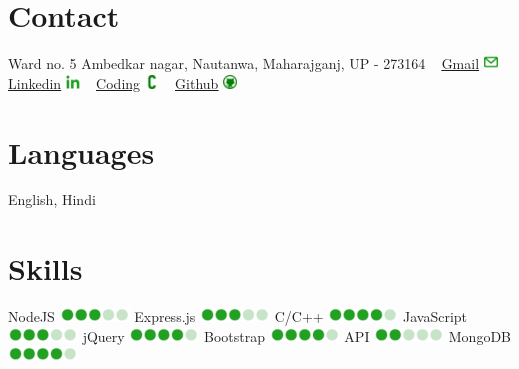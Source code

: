 \documentclass[]{cv-style}          %
\begin{document}
\newcommand{\Iconemail}{\includegraphics[width=1em]{email.png}}
\newcommand{\Iconlinkedin}{\includegraphics[width=1em]{linkedin.png}}
\newcommand{\Iconc}{\includegraphics[width=1em]{c.jpg}}
\newcommand{\Icongithub}{\includegraphics[width=1em]{github.jpg}}
\newcommand{\Iconone}{\includegraphics[width=5em]{1.png}}
\newcommand{\Icontwo}{\includegraphics[width=5em]{2.png}}
\newcommand{\Iconthree}{\includegraphics[width=5em]{3.png}}
\newcommand{\Iconfour}{\includegraphics[width=5em]{4.png}}
\newcommand{\Iconfive}{\includegraphics[width=5em]{5.png}}



\begin{aside}
%
\section{Contact}
Ward no. 5 Ambedkar nagar, Nautanwa, Maharajganj, UP - 273164
~
\href{mailto:arsalanmohd237@gmail.com}{\underline{Gmail}} \Iconemail
~
\href{https://www.linkedin.com/in/mohammad-arsalan-3a2377191/}{\underline{Linkedin}} \Iconlinkedin 
~
\href{https://www.stopstalk.com/user/profile/arsalan9911}{\underline{Coding}} \Iconc
~
\href{https://github.com/arsalanhub}{\underline{Github}} \Icongithub
%
\section{Languages}
English, Hindi
%
\section{Skills}
NodeJS 
\Iconthree
Express.js
\Iconthree
C/C++
\Iconfour
JavaScript
\Iconthree
jQuery
\Iconfour
Bootstrap
\Iconfour
API
\Icontwo
MongoDB
\Iconfour
%
\end{aside}
\end{document}
